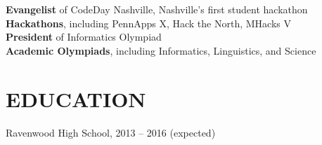 \documentclass{res}
\begin{document}
\textbf{Evangelist} of CodeDay Nashville, Nashville's first student hackathon \\[1mm]
\textbf{Hackathons}, including PennApps X, Hack the North, MHacks V \\[1mm]
\textbf{President} of Informatics Olympiad \\[1mm]
\textbf{Academic Olympiads}, including Informatics, Linguistics, and Science

\section{EDUCATION}

Ravenwood High School, 2013 -- 2016 {(expected)}
\end{document}
